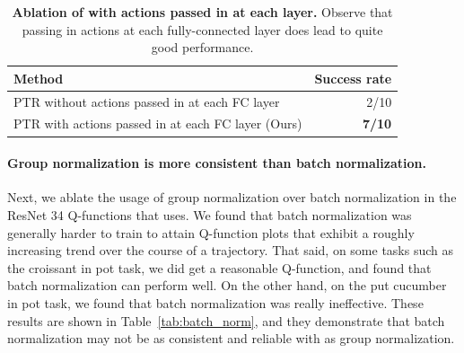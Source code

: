 \documentclass[../thesis.tex]{subfiles}
\begin{document}
\begin{table}[h]
\centering
\begin{tabular}{l|r}
\toprule
\textbf{Method} & \textbf{Success rate}\\  \midrule
PTR without actions passed in at each FC layer & 2/10 \\
PTR with actions passed in at each FC layer (Ours) & \textbf{7/10} \\
\bottomrule
\end{tabular}
\vspace{0.1cm}
\caption{\footnotesize{\textbf{Ablation of \ptrmethodname with actions passed in at each layer.} Observe that passing in actions at each fully-connected layer does lead to quite good performance.}}
\label{tab:action_sep}
\end{table}

\paragraph{Group normalization is more consistent than batch normalization.} Next, we ablate the usage of group normalization over batch normalization in the ResNet 34 Q-functions that \ptrmethodname uses. We found that batch normalization was generally harder to train to attain Q-function plots that exhibit a roughly increasing trend over the course of a trajectory. That said, on some tasks such as the croissant in pot task, we did get a reasonable Q-function, and found that batch normalization can perform well. On the other hand, on the put cucumber in pot task, we found that batch normalization was really ineffective. These results are shown in {Table~\ref{tab:batch_norm}}, and they demonstrate that batch normalization may not be as consistent and reliable with \ptrmethodname as group normalization.
\end{document}

